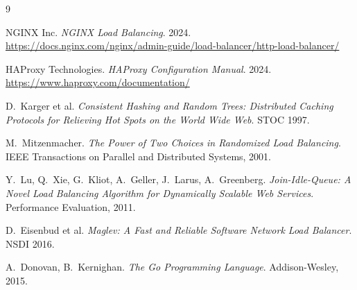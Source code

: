 \documentclass[12pt]{article}
\begin{document}
\begin{thebibliography}{9}

NGINX Inc. \textit{NGINX Load Balancing}. 2024.
\url{https://docs.nginx.com/nginx/admin-guide/load-balancer/http-load-balancer/}

HAProxy Technologies. \textit{HAProxy Configuration Manual}. 2024.
\url{https://www.haproxy.com/documentation/}

D.~Karger et al. \textit{Consistent Hashing and Random Trees: Distributed
Caching Protocols for Relieving Hot Spots on the World Wide Web}. STOC 1997.

M.~Mitzenmacher. \textit{The Power of Two Choices in Randomized Load
Balancing}. IEEE Transactions on Parallel and Distributed Systems, 2001.

Y.~Lu, Q.~Xie, G.~Kliot, A.~Geller, J.~Larus, A.~Greenberg. \textit{Join-Idle-Queue:
A Novel Load Balancing Algorithm for Dynamically Scalable Web Services}.
Performance Evaluation, 2011.

D.~Eisenbud et al. \textit{Maglev: A Fast and Reliable Software Network Load
Balancer}. NSDI 2016.

A.~Donovan, B.~Kernighan. \textit{The Go Programming Language}. Addison-Wesley,
2015.

\end{thebibliography}
\end{document}
